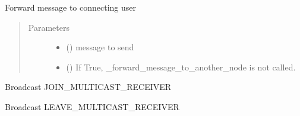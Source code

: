 \documentclass[letterpaper,10pt,english]{sphinxmanual}
\begin{document}
\begin{fulllineitems}
\begin{fulllineitems}
\begin{quote}
\begin{description}
\end{description}\end{quote}

\end{fulllineitems}


\begin{fulllineitems}
\label{\detokenize{bbc1.core.user_message_routing:bbc1.core.user_message_routing.UserMessageRouting.send_message_to_user}}
Forward message to connecting user
\begin{quote}\begin{description}
\item[{Parameters}] \leavevmode\begin{itemize}
\item {} 
 () \textendash{} message to send

\item {} 
 () \textendash{} If True, \_forward\_message\_to\_another\_node is not called.

\end{itemize}

\end{description}\end{quote}

\end{fulllineitems}


\begin{fulllineitems}
\label{\detokenize{bbc1.core.user_message_routing:bbc1.core.user_message_routing.UserMessageRouting.send_multicast_join}}
Broadcast JOIN\_MULTICAST\_RECEIVER

\end{fulllineitems}


\begin{fulllineitems}
\label{\detokenize{bbc1.core.user_message_routing:bbc1.core.user_message_routing.UserMessageRouting.send_multicast_leave}}
Broadcast LEAVE\_MULTICAST\_RECEIVER


\end{fulllineitems}
\end{fulllineitems}
\end{document}
